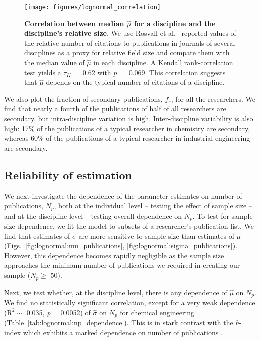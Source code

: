 \begin{figure}[t]
\texttt{[image: figures/lognormal\_correlation]}
\caption[Correlation between median $\hat{\mu}$ and discipline relative size.]{\textbf{Correlation between median $\hat{\mu}$ for a discipline and the discipline's relative size}. We use Rosvall et al.\ \cite{Rosvall2008} reported values of the relative number of citations to publications in journals of several disciplines as a proxy for relative field size and compare them with the median value of $\hat{\mu}$ in each discipline. A Kendall rank-correlation test yields a $\tau_K =$ 0.62 with $p =$ 0.069. This correlation suggests that $\hat{\mu}$ depends on the typical number of citations of a discipline.}
\label{fig:lognormal:correlation}
\end{figure}

We also plot the fraction of secondary publications, $f_s$, for all the researchers. We find that nearly a fourth of the publications of half of all researchers are secondary, but intra-discipline variation is high. Inter-discipline variability is also high: 17\% of the publications of a typical researcher in chemistry are secondary, whereas 60\% of the publications of a typical researcher in industrial engineering are secondary.


\subsection{Reliability of estimation}

We next investigate the dependence of the parameter estimates on number of publications, $N_p$, both at the individual level -- testing the effect of sample size -- and at the discipline level -- testing overall dependence on $N_p$. To test for sample size dependence, we fit the model to subsets of a researcher's publication list. We find that estimates of $\sigma$ are more sensitive to sample size than estimates of $\mu$ (Figs.~\ref{fig:lognormal:mu_publications}, \ref{fig:lognormal:sigma_publications}). However, this dependence becomes rapidly negligible as the sample size approaches the minimum number of publications we required in creating our sample ($N_p \ge$ 50).

Next, we test whether, at the discipline level, there is any dependence of $\hat{\mu}$ on $N_p$. We find no statistically significant correlation, except for a very weak dependence ($\textrm{R}^2 \sim$ 0.035, \textit{p} = 0.0052) of $\hat{\sigma}$ on $N_p$ for chemical engineering (Table~\ref{tab:lognormal:np_dependence}). This is in stark contrast with the \emph{h}-index which exhibits a marked dependence on number of publications \cite{Egghe2007}.

